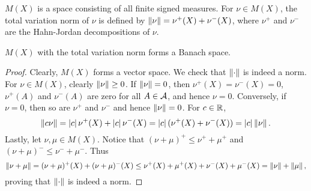 \begin{definition}
    $M(X)$ is a space consisting of all finite signed measures. 
    For $\nu\in M(X)$, the total variation norm of $\nu$ is 
    defined by $\left\lVert {\nu} \right\rVert = \nu^+(X) + \nu^-(X)$, where $\nu^+$ 
    and $\nu^-$ are the Hahn-Jordan decompositions of $\nu$. 
\end{definition}

\begin{proposition}
    $M(X)$ with the total variation norm forms a Banach space.
\end{proposition}
\begin{proof}
    Clearly, $M(X)$ forms a vector space. We check that $\left\lVert {\cdot} \right\rVert$ 
    is indeed a norm. For $\nu\in M(X)$, clearly $\left\lVert {\nu} \right\rVert\geq 0$. If 
    $\left\lVert {\nu} \right\rVert = 0$, then $\nu^+(X) = \nu^-(X) = 0$, $\nu^+(A)$ and 
    $\nu^-(A)$ are zero for all $A\in\mathcal{A}$, and hence $\nu = 0$. Conversely, 
    if $\nu = 0$, then so are $\nu^+$ and $\nu^-$ and hence $\left\lVert {\nu} \right\rVert = 0$. 
    For $c\in\mathbb{R}$, 
    \begin{equation*}
        \left\lVert {c\nu} \right\rVert = \left\lvert {c} \right\rvert\nu^+(X) + \left\lvert {c} \right\rvert\nu^-(X) 
        = \left\lvert {c} \right\rvert(\nu^+(X) + \nu^-(X)) = \left\lvert {c} \right\rvert\left\lVert {\nu} \right\rVert.
    \end{equation*}
    Lastly, let $\nu,\mu\in M(X)$. Notice that $(\nu+\mu)^+\leq \nu^+ + \mu^+$ 
    and $(\nu+\mu)^-\leq \nu^- + \mu^-$. Thus 
    \begin{equation*}
        \left\lVert {\nu+\mu} \right\rVert = (\nu+\mu)^+(X) + (\nu+\mu)^-(X) 
        \leq \nu^+(X) + \mu^+(X) + \nu^-(X) + \mu^-(X) 
        = \left\lVert {\nu} \right\rVert + \left\lVert {\mu} \right\rVert,
    \end{equation*}
    proving that $\left\lVert {\cdot} \right\rVert$ is indeed a norm. 


\end{proof}
